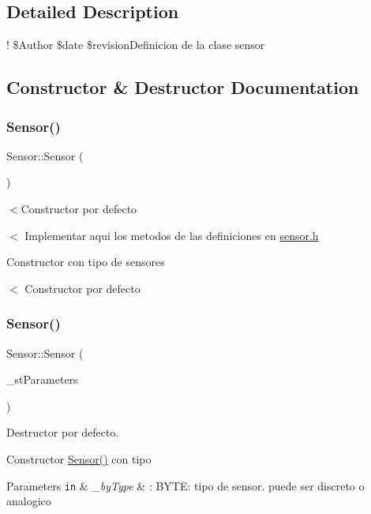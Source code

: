 \subsection{Detailed Description}
! \$\+Author \$date \$revision\+Definicion de la clase sensor 

\subsection{Constructor \& Destructor Documentation}
\mbox{\label{classSensor_a342d6d11ef572c8cba92cb76fb1a294b}} 
\subsubsection{\texorpdfstring{Sensor()}{Sensor()}\hspace{0.1cm}{\footnotesize\ttfamily [1/2]}}
{\footnotesize\ttfamily Sensor\+::\+Sensor (\begin{DoxyParamCaption}{ }\end{DoxyParamCaption})}



$<$Constructor por defecto 

$<$ Implementar aqui los metodos de las definiciones en \hyperlink{sensor_8h_source}{sensor.\+h}

Constructor con tipo de sensores

$<$ Constructor por defecto \mbox{\label{classSensor_a852e9b06ce6e4a911105a8c388df1ce9}} 
\subsubsection{\texorpdfstring{Sensor()}{Sensor()}\hspace{0.1cm}{\footnotesize\ttfamily [2/2]}}
{\footnotesize\ttfamily Sensor\+::\+Sensor (\begin{DoxyParamCaption}\item[{st\+Sensor\+Params}]{\+\_\+st\+Parameters }\end{DoxyParamCaption})}



Destructor por defecto. 

Constructor \hyperlink{classSensor_a342d6d11ef572c8cba92cb76fb1a294b}{Sensor()} con tipo 
\begin{DoxyParams}[1]{Parameters}
\mbox{\tt in}  & {\em \+\_\+by\+Type} & \+: B\+Y\+TE\+: tipo de sensor. puede ser discreto o analogico \\
\hline
\end{DoxyParams}


